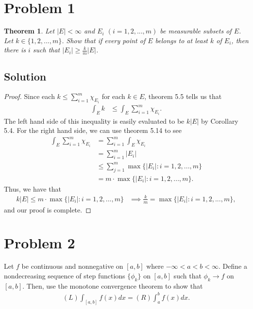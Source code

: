 \documentclass[10pt,a4paper]{article}
\author{Jeremiah Givens}
\theoremstyle{theorem}
\newtheorem{theorem}{Theorem}
\theoremstyle{definition}
\begin{document}
\section*{Problem 1}
\begin{theorem}
Let $|E| < \infty$ and $E_i$ $(i = 1,2,...,m)$ be measurable subsets of $E$. Let $k \in \{1,2,...,m\}$. Show that if every point of $E$ belongs to at least $k$ of $E_i$, then there is $i$ such that $|E_i| \geq \frac{k}{m}|E|$.
\end{theorem}

\subsection*{Solution}
\begin{proof}
Since each $k \leq \sum_{i = 1}^m \chi_{E_i}$ for each $k \in E$, theorem 5.5 tells us that 
\begin{align*}
\int_E k &\leq \int_E \sum_{i = 1}^m \chi_{E_i}.
\end{align*}
The left hand side of this inequality is easily evaluated to be $k|E|$ by Corollary 5.4. For the right hand side, we can use theorem 5.14 to see
\begin{align*}
\int_E \sum_{i = 1}^m \chi_{E_i} &= \sum_{i = 1}^m \int_E \chi_{E_i}\\
&= \sum_{i = 1}^m |E_i|\\
&\leq \sum_{j = 1}^m \max \{|E_i|: i = 1, 2, ..., m\}\\
&= m \cdot \max \{|E_i|: i = 1, 2, ..., m\}.
\end{align*}
Thus, we have that 
\begin{align*}
k|E| \leq m \cdot \max \{|E_i|: i = 1, 2, ..., m\} &\implies \frac{k}{m} = \max \{|E_i|: i = 1, 2, ..., m\},
\end{align*}
and our proof is complete.
\end{proof}

\section*{Problem 2}
Let $f$ be continuous and nonnegative on $[a, b]$ where $-\infty < a < b < \infty$. Define a nondecreasing sequence of step functions $\{\phi_k \}$ on $[a, b]$ such that $\phi_k \to f$ on $[a, b]$. Then,  use the monotone convergence theorem to show that
\begin{align*}
(L) \int_{[a, b]} f(x) dx = (R) \int_a^b f(x)dx.
\end{align*}
\end{document}
